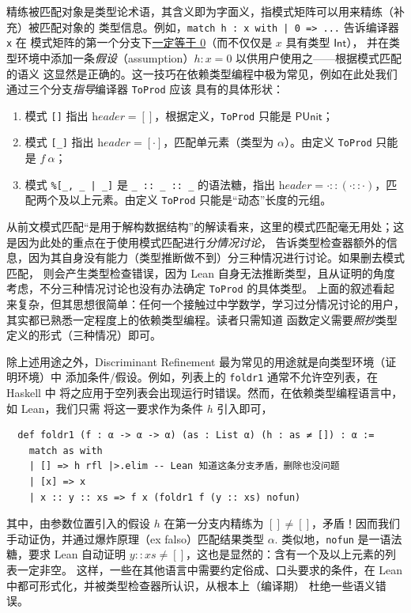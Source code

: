 精练被匹配对象是类型论术语，其含义即为字面义，指模式矩阵可以用来精练（补充）被匹配对象的
类型信息。例如，\texttt{match h : x with | 0 => ...} 告诉编译器 \texttt{x} 在
模式矩阵的第一个分支下\underline{一定等于 0}（而不仅仅是 $x$ 具有类型 $\mathsf{Int}$），
并在类型环境中添加一条\emph{假设}（assumption）$h : x = 0$ 以供用户使用之——根据模式匹配的语义
这显然是正确的。这一技巧在依赖类型编程中极为常见，例如在此处我们通过三个分支\emph{指导}编译器 \texttt{ToProd} 应该
具有的具体形状：
\begin{enumerate}
\item 模式 \texttt{[]} 指出 $\textit{header} = []$，根据定义，\texttt{ToProd} 只能是 $\mathsf{PUnit}$；
\item 模式 \texttt{[\_]} 指出 $\textit{header} = [\cdot]$，匹配单元素（类型为 $\alpha$）。由定义 \texttt{ToProd} 只能是 $f\ \alpha$；
\item 模式 \texttt{\%[\_, \_ | \_]} 是 \texttt{\_ :: \_ :: \_} 的语法糖，指出
$\textit{header} = \cdot :: (\cdot :: \cdot)$，匹配两个及以上元素。由定义 \texttt{ToProd} 只能是“动态”长度的元组。
\end{enumerate}
从前文模式匹配“是用于解构数据结构”的解读看来，这里的模式匹配毫无用处；这是因为此处的重点在于使用模式匹配进行\emph{分情况讨论}，
告诉类型检查器额外的信息，因为其自身没有能力（类型推断做不到）分三种情况进行讨论。如果删去模式匹配，
则会产生类型检查错误，因为 Lean 自身无法推断类型，且从证明的角度考虑，不分三种情况讨论也没有办法确定 \texttt{ToProd} 的具体类型。
上面的叙述看起来复杂，但其思想很简单：任何一个接触过中学数学，学习过分情况讨论的用户，其实都已熟悉一定程度上的依赖类型编程。读者只需知道
函数定义需要\emph{照抄}类型定义的形式（三种情况）即可。

\begin{remark}
除上述用途之外，Discriminant Refinement 最为常见的用途就是向类型环境（证明环境）中
添加条件/假设。例如，列表上的 \texttt{foldr1} 通常不允许空列表，在 Haskell 中
将之应用于空列表会出现运行时错误。然而，在依赖类型编程语言中，如 Lean，我们只需
将这一要求作为条件 $h$ 引入即可，
\begin{verbatim}
  def foldr1 (f : α -> α -> α) (as : List α) (h : as ≠ []) : α :=
    match as with
    | [] => h rfl |>.elim -- Lean 知道这条分支矛盾，删除也没问题
    | [x] => x
    | x :: y :: xs => f x (foldr1 f (y :: xs) nofun)
\end{verbatim}
其中，由参数位置引入的假设 $h$ 在第一分支内精练为 $[]\neq[]$，矛盾！因而我们手动证伪，并通过爆炸原理（ex falso）匹配结果类型 $\alpha$.
类似地，\texttt{nofun} 是一语法糖，要求 Lean 自动证明 $y :: xs \neq []$，这也是显然的：含有一个及以上元素的列表一定非空。
这样，一些在其他语言中需要约定俗成、口头要求的条件，在 Lean 中都可形式化，并被类型检查器所认识，从根本上（编译期）
杜绝一些语义错误。
\end{remark}

